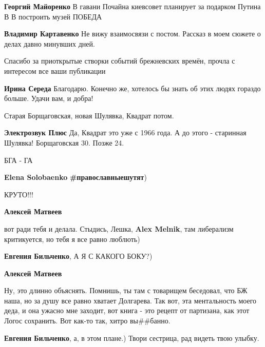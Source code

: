 \begin{itemize}
\begin{itemize}
\textbf{Георгий Майоренко} В гавани Почайна киевсовет планирует за подарком Путина В В построить музей ПОБЕДА

\textbf{Владимир Картавенко} Не вижу взаимосвязи с постом. Рассказ в моем сюжете о делах давно минувших дней.
\end{itemize} %


Спасибо за приоткрытые створки событий брежневских времён, прочла с интересом
все ваши публикации

\begin{itemize} %
\textbf{Ирина Середа} Благодарю. Конечно же, хотелось бы знать об этих людях гораздо больше. Удачи вам, и добра!
\end{itemize} %

Старая Борщаговская, новая Шулявка, Квадрат потом.

\begin{itemize} %
\textbf{Электрозвук Плюс} Да, Квадрат это уже с 1966 года. А до этого - старинная Шулявка! Борщаговская 30. Позже 24.
\end{itemize} %

БГА - ГА

\begin{itemize} %
\textbf{Elena Solobaenko} \textbf{\#православныешутят})
\end{itemize} %

КРУТО!!!

\begin{itemize} %
\textbf{Алексей Матвеев} 

вот ради тебя и делала. Стыдись, Лешка, \textbf{Alex Melnik}, там либерализм
критикуется, но тебя я все равно люблють)

\textbf{Евгения Бильченко}, А Я С КАКОГО БОКУ?)

\textbf{Алексей Матвеев} 

Ну, это длинно объяснять. Помнишь, ты там с товарищем беседовал, что БЖ наша,
но за душу все равно хватает Долгарева. Так вот, эта ментальность моего деда, и
она ужасно мне заходит, вот книга - это рецепт от партизана, как этот Логос
сохранить. Вот как-то так, хитро вы\#\#банно.

\textbf{Евгения Бильченко}, а, в этом плане.) Твори сестрица, рад видеть твою улыбку.
\end{itemize} %


\end{itemize}
